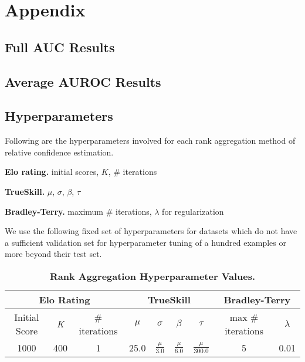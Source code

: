 \section{Appendix}
\subsection{Full AUC Results}
\label{appendix:auc_results}




\subsection{Average AUROC Results}
\label{appendix:auroc_results}


\subsection{Hyperparameters}
\label{appendix:hyperparameters}
Following are the hyperparameters involved for each rank aggregation method of relative confidence estimation.

\textbf{Elo rating.} initial scores, $K$, $\#$ iterations

\textbf{TrueSkill.} $\mu$, $\sigma$, $\beta$, $\tau$

\textbf{Bradley-Terry.} maximum $\#$ iterations, $\lambda$ for regularization

We use the following fixed set of hyperparameters for datasets which do not have a sufficient validation set for hyperparameter tuning of a hundred examples or more beyond their test set.

\begin{table}[H]
\centering
\begin{tabular}{@{}ccc|cccc|cc@{}}
\toprule
\multicolumn{3}{c|}{Elo Rating} & \multicolumn{4}{c|}{TrueSkill} & \multicolumn{2}{c}{Bradley-Terry} \\ \midrule
Initial Score & \textit{K} & \# iterations & $\mu$ & $\sigma$ & $\beta$ & $\tau$ & max \# iterations & $\lambda$ \\ \midrule
1000 & 400 & 1 & 25.0 & $\frac{\mu}{3.0}$ & $\frac{\mu}{6.0}$ & $\frac{\mu}{300.0}$ & 5 & 0.01 \\ \bottomrule
\end{tabular}
\caption{\textbf{Rank Aggregation Hyperparameter Values.}}
\label{tab:rank_agg_hyperparams}
\end{table}

